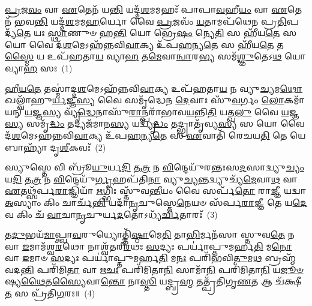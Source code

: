 \setcounter{anuvakam}{0}
\-\ul{𑌪𑍍𑌰}\-𑌜\-\ul{𑌵𑌂} 𑌵𑌾 \ul{𑌏}\-𑌤𑍇𑌨᳴ 𑌯\-\ul{𑌨𑍍𑌤𑌿} 𑌯𑌦𑍍𑌦᳴\-\ul{𑌶}\-𑌮𑌮𑌹𑌃᳴ 𑌪𑌾𑌪𑌾\-\ul{𑌵}\-𑌹𑍀\-\ul{𑌯𑌂} 𑌵𑌾 \ul{𑌏}\-𑌤𑍇𑌨᳴ 𑌭𑌵\-\ul{𑌨𑍍𑌤𑌿} 𑌯𑌦𑍍𑌦᳴\-\ul{𑌶}\-𑌮𑌮\-\ul{𑌹}\-𑌰𑍍𑌯𑍋 𑌵𑍈 \ul{𑌪𑍍𑌰}\-𑌜𑌵𑌂᳴ \ul{𑌯}\-𑌤𑌾𑌮𑌪᳴𑌥𑍇𑌨 𑌪𑍍𑌰\-\ul{𑌤𑌿}\-𑌪𑌦𑍍𑌯᳴\-\ul{𑌤𑍇} 𑌯𑌃 \ul{𑌸𑍍𑌥𑌾}\-𑌣𑍁𑍞 𑌹\-\ul{𑌨𑍍𑌤𑌿} 𑌯𑍋 𑌭𑍍𑌰𑍇\-\ul{𑌷𑌂} 𑌨𑍍𑌯𑍇\-\ul{𑌤𑌿} 𑌸 𑌹𑍀᳴𑌯\-\ul{𑌤𑍇} 𑌸 𑌯𑍋 𑌵𑍈 𑌦᳴\-\ul{𑌶}\-𑌮𑍇\-𑌽𑌹᳴𑌨𑍍𑌨𑌵𑌿\-\ul{𑌵𑌾}\-𑌕𑍍𑌯 𑌉᳴𑌪\-\ul{𑌹}\-𑌨𑍍𑌯\-\ul{𑌤𑍇} 𑌸 𑌹𑍀᳴𑌯\-\ul{𑌤𑍇} 𑌤\-\ul{𑌸𑍍𑌮𑍈} 𑌯 𑌉𑌪᳴𑌹𑌤𑌾\-\ul{𑌯} 𑌵𑍍𑌯𑌾\-\ul{𑌹} 𑌤\-\ul{𑌮𑍇}\-𑌵𑌾\-\ul{𑌨𑍍𑌵𑌾}\-𑌰\-\ul{𑌭𑍍𑌯} 𑌸𑌮᳴\-\ul{𑌶𑍍𑌞𑍁}\-𑌤𑍇\-𑌽\-\ul{𑌥} 𑌯𑍋 𑌵𑍍𑌯𑌾\-\ul{𑌹} 𑌸𑌃~(1)

\-\ul{𑌹𑍀}\-\-\ul{𑌯}\-\-\ul{𑌤𑍇} 𑌤𑌸𑍍𑌮𑌾॑𑌦𑍍𑌦\-\ul{𑌶}\-𑌮𑍇\-𑌽𑌹᳴𑌨𑍍𑌨𑌵𑌿\-\ul{𑌵𑌾}\-𑌕𑍍𑌯 𑌉𑌪᳴𑌹𑌤𑌾\-\ul{𑌯} 𑌨 𑌵𑍍𑌯𑍁\-\ul{𑌚𑍍𑌯}\-𑌮\-\ul{𑌥𑍋} 𑌖𑌲𑍍𑌵𑌾᳴𑌹𑍁\-\ul{𑌰𑍍𑌯}\-𑌜𑍍𑌞\-\ul{𑌸𑍍𑌯} 𑌵𑍈 𑌸𑌮𑍃᳴𑌦𑍍𑌧𑍇𑌨 \ul{𑌦𑍇}\-𑌵𑌾𑌃 𑌸𑍁᳴\-\ul{𑌵}\-𑌰𑍍𑌗𑌂 \ul{𑌲𑍋}\-𑌕𑌮𑌾᳴𑌯𑌨𑍍 \ul{𑌯}\-𑌜𑍍𑌞\-\ul{𑌸𑍍𑌯} 𑌵𑍍𑌯𑍃᳴\-\ul{𑌦𑍍𑌧𑍇}\-𑌨𑌾𑌸𑍁᳴\-\ul{𑌰𑌾}\-𑌨𑍍𑌪𑌰𑌾᳴𑌭𑌾𑌵\-\ul{𑌯}\-𑌨𑍍𑌨𑌿\-\ul{𑌤𑌿} 𑌯𑌤𑍍𑌖\-\ul{𑌲𑍁} 𑌵𑍈 \ul{𑌯}\-𑌜𑍍𑌞\-\ul{𑌸𑍍𑌯} 𑌸𑌮𑍃᳴\-\ul{𑌦𑍍𑌧𑌂} 𑌤𑌦𑍍𑌯𑌜᳴𑌮𑌾𑌨\-\ul{𑌸𑍍𑌯} 𑌯𑌦𑍍𑌵𑍍𑌯𑍃᳴\-\ul{𑌦𑍍𑌧𑌂} 𑌤𑌦𑍍𑌭𑍍𑌰𑌾𑌤𑍃᳴𑌵𑍍𑌯\-\ul{𑌸𑍍𑌯} 𑌸 𑌯𑍋 𑌵𑍈 𑌦᳴\-\ul{𑌶}\-𑌮𑍇\-𑌽𑌹᳴𑌨𑍍𑌨𑌵𑌿\-\ul{𑌵𑌾}\-𑌕𑍍𑌯 𑌉᳴𑌪\-\ul{𑌹}\-𑌨𑍍𑌯\-\ul{𑌤𑍇} 𑌸 \ul{𑌏}\-𑌵𑌾𑌤𑌿᳴ 𑌰𑍇𑌚𑌯\-\ul{𑌤𑌿} 𑌤𑍇 𑌯𑍇 𑌬𑌾𑌹𑍍𑌯𑌾᳴ 𑌦𑍃\-\ul{𑌶𑍀}\-𑌕𑌵𑌃᳴~(2)

𑌸𑍍𑌯𑍁𑌸𑍍𑌤𑍇 𑌵𑌿 𑌬𑍍𑌰𑍂᳴\-\ul{𑌯𑍁}\-𑌰𑍍𑌯\-\ul{𑌦𑌿} 𑌤\-\ul{𑌤𑍍𑌰} 𑌨 \ul{𑌵𑌿}\-𑌨𑍍𑌦𑍇𑌯𑍁᳴𑌰𑌨𑍍𑌤𑌃𑌸\-\ul{𑌦}\-𑌸𑌾𑌦𑍍𑌵𑍍𑌯𑍁\-\ul{𑌚𑍍𑌯𑌂} 𑌯\-\ul{𑌦𑌿} 𑌤\-\ul{𑌤𑍍𑌰} 𑌨 \ul{𑌵𑌿}\-𑌨𑍍𑌦𑍇𑌯𑍁᳴\-\ul{𑌰𑍍𑌗𑍃}\-𑌹𑌪᳴𑌤𑌿\-\ul{𑌨𑌾} 𑌵𑍍𑌯𑍁\-\ul{𑌚𑍍𑌯}\-𑌨𑍍𑌤𑌦𑍍𑌵𑍍𑌯𑍁𑌚𑍍𑌯᳴\-\ul{𑌮𑍇}\-𑌵𑌾\-\ul{𑌥} 𑌵𑌾 \ul{𑌏}\-𑌤𑌥𑍍𑌸᳴𑌰𑍍𑌪\-\ul{𑌰𑌾}\-𑌜𑍍𑌞𑌿𑌯𑌾᳴ \ul{𑌋}\-𑌗𑍍𑌭𑌿𑌃 𑌸𑍍𑌤𑍁᳴𑌵\-\ul{𑌨𑍍𑌤𑍀}\-𑌯𑌂 𑌵𑍈 𑌸𑌰𑍍𑌪᳴\-\ul{𑌤𑍋} 𑌰𑌾\-\ul{𑌜𑍍𑌞𑍀} 𑌯𑌦𑍍𑌵𑌾 \ul{𑌅}\-𑌸𑍍𑌯𑌾𑌂 𑌕𑌿𑌂 𑌚𑌾𑌰𑍍𑌚᳴\-\ul{𑌨𑍍𑌤𑌿} 𑌯𑌦𑌾᳴\-\ul{𑌨𑍃}\-𑌚𑍁𑌸𑍍𑌤𑍇\-\ul{𑌨𑍇}\-𑌯𑍞 𑌸᳴𑌰𑍍𑌪\-\ul{𑌰𑌾}\-𑌜𑍍𑌞𑍀 𑌤𑍇 𑌯\-\ul{𑌦𑍇}\-𑌵 𑌕𑌿𑌂 𑌚᳴ \ul{𑌵𑌾}\-𑌚𑌾\-\ul{𑌨𑍃}\-𑌚𑍁𑌰𑍍𑌯\-\ul{𑌦}\-𑌤𑍋\-𑌽𑌧𑍍𑌯᳴\-\ul{𑌰𑍍𑌚𑌿}\-𑌤𑌾𑌰𑌃᳴~(3)

𑌤\-\ul{𑌦𑍁}\-𑌭𑌯᳴\-\ul{𑌮𑌾}\-𑌪𑍍𑌤𑍍𑌵𑌾\-\ul{𑌵}\-𑌰𑍁𑌧𑍍𑌯𑍋𑌤𑍍𑌤𑌿᳴\-\ul{𑌷𑍍𑌠𑌾}\-𑌮𑍇\-\ul{𑌤𑌿} 𑌤𑌾\-\ul{𑌭𑌿}\-𑌰𑍍𑌮𑌨᳴𑌸𑌾 𑌸𑍍𑌤𑍁𑌵\-\ul{𑌤𑍇} 𑌨 𑌵𑌾 \ul{𑌇}\-𑌮𑌾𑌮᳴𑌶𑍍𑌵\-\ul{𑌰}\-𑌥𑍋 𑌨𑌾𑌶𑍍𑌵᳴𑌤𑌰𑍀\-\ul{𑌰}\-𑌥𑌃 \ul{𑌸}\-𑌦𑍍𑌯𑌃 𑌪𑌰𑍍𑌯𑌾॑𑌪𑍍𑌤𑍁𑌮𑌰𑍍\mbox{}𑌹\-\ul{𑌤𑌿} 𑌮\-\ul{𑌨𑍋} 𑌵𑌾 \ul{𑌇}\-𑌮𑌾𑍞 \ul{𑌸}\-𑌦𑍍𑌯𑌃 𑌪𑌰𑍍𑌯𑌾॑𑌪𑍍𑌤𑍁𑌮𑌰𑍍\mbox{}𑌹\-\ul{𑌤𑌿} 𑌮\-\ul{𑌨𑌃} 𑌪𑌰𑌿᳴𑌭𑌵𑌿\-\ul{𑌤𑍁}\-𑌮\-\ul{𑌥} 𑌬𑍍𑌰𑌹𑍍𑌮᳴ 𑌵𑌦\-\ul{𑌨𑍍𑌤𑌿} 𑌪𑌰𑌿᳴𑌮𑌿\-\ul{𑌤𑌾} 𑌵𑌾 𑌋\-\ul{𑌚𑌃} 𑌪𑌰𑌿᳴𑌮𑌿𑌤𑌾\-\ul{𑌨𑌿} 𑌸𑌾𑌮𑌾᳴\-\ul{𑌨𑌿} 𑌪𑌰𑌿᳴𑌮𑌿𑌤𑌾\-\ul{𑌨𑌿} 𑌯\-\ul{𑌜𑍂}\-\-\ul{𑍞}\-𑌷𑍍𑌯\-\ul{𑌥𑍈}\-𑌤\-\ul{𑌸𑍍𑌯𑍈}\-𑌵𑌾\-\ul{𑌨𑍍𑌤𑍋} 𑌨𑌾\-\ul{𑌸𑍍𑌤𑌿} 𑌯𑌦𑍍𑌬𑍍𑌰\-\ul{𑌹𑍍𑌮} 𑌤𑌤𑍍𑌪𑍍𑌰᳴𑌤𑌿𑌗𑍃\-\ul{𑌣}\-𑌤 𑌆 𑌚᳴𑌕𑍍𑌷𑍀\-\ul{𑌤} 𑌸 𑌪𑍍𑌰᳴𑌤𑌿\-\ul{𑌗}\-𑌰𑌃॥~(4)

{\anuvakamend[{𑌵𑍍𑌯𑌾\-\ul{𑌹} 𑌸 𑌦𑍃᳴\-\ul{𑌶𑍀}\-𑌕𑌵𑍋॑\-𑌽\-\ul{𑌰𑍍𑌚𑌿}\-𑌤𑌾\-\ul{𑌰𑌃} 𑌸 𑌏𑌕᳴𑌞𑍍𑌚}]}%

